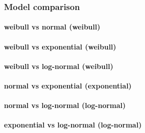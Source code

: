 \documentclass[]{article}
\let\oldparagraph\paragraph
\renewcommand{\paragraph}[1]{\oldparagraph{#1}\mbox{}}
\begin{document}
\hypertarget{model-comparison-1}{%
\subsubsection{Model comparison}\label{model-comparison-1}}

\hypertarget{weibull-vs-normal-weibull-1}{%
\paragraph{weibull vs normal
(weibull)}\label{weibull-vs-normal-weibull-1}}

\hypertarget{weibull-vs-exponential-weibull-1}{%
\paragraph{weibull vs exponential
(weibull)}\label{weibull-vs-exponential-weibull-1}}

\hypertarget{weibull-vs-log-normal-weibull-1}{%
\paragraph{weibull vs log-normal
(weibull)}\label{weibull-vs-log-normal-weibull-1}}

\hypertarget{normal-vs-exponential-exponential-1}{%
\paragraph{normal vs exponential
(exponential)}\label{normal-vs-exponential-exponential-1}}

\hypertarget{normal-vs-log-normal-log-normal-1}{%
\paragraph{normal vs log-normal
(log-normal)}\label{normal-vs-log-normal-log-normal-1}}

\hypertarget{exponential-vs-log-normal-log-normal-1}{%
\paragraph{exponential vs log-normal
(log-normal)}\label{exponential-vs-log-normal-log-normal-1}}
\end{document}
